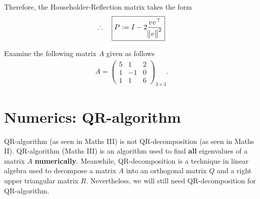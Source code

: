 \documentclass[12pt]{article}
\begin{document}
Therefore, the Householder-Reflection matrix takes the form
\begin{align}
	\therefore\quad\boxed{
		P:=	I -2 \frac{vv^{\top}}{\norm[1]{v}^2}
	}
\end{align}
\clearpage
\begin{exampleboxed}
	Examine the following matrix $A$ given as follows
	\begin{align}
		A = \begin{pmatrix} 5 &1 &2 \\ 1 &-1 &0 \\ 1 &1 &6 \end{pmatrix}_{3\times 3}.
	\end{align}
\end{exampleboxed}

\clearpage
\section{Numerics: QR-algorithm}
\begin{observationboxed}
	QR-algorithm (as seen in Maths III) is not QR-decomposition (as seen in Maths II). 
	QR-algorithm (Maths III) is an algorithm used to find 
	\textbf{all} eigenvalues of a matrix $A$ \textbf{numerically}. Meanwhile, 
	QR-decomposition is a technique in linear algebra used to decompose 
	a matrix $A$ into an orthogonal matrix $Q$ and a right upper triangular matrix $R$.
	Nevertheless, we will still need QR-decomposition for QR-algorithm.
\end{observationboxed}
\clearpage
\end{document}
